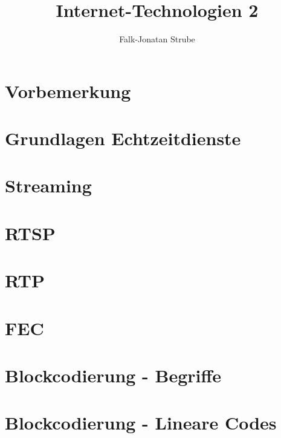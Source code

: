 \documentclass{scrreprt}
\title{Internet-Technologien 2}
\author{Falk-Jonatan Strube}
\begin{document}
\maketitle
\tableofcontents

\chapter*{Vorbemerkung}

\chapter{Grundlagen Echtzeitdienste}


\chapter{Streaming}


\chapter{RTSP}


\chapter{RTP}


\chapter{FEC}


\chapter{Blockcodierung - Begriffe}


\chapter{Blockcodierung - Lineare Codes}



\end{document}
